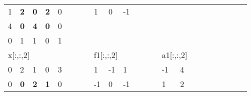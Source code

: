 \begin{table}[h]
\begin{tabular}{lllllllllllllllllllllll}
\multicolumn{1}{|l|}{1} & \multicolumn{1}{l|}{\textbf{2}} & \multicolumn{1}{l|}{\textbf{0}} & \multicolumn{1}{l|}{\textbf{2}} & \multicolumn{1}{l|}{0} &  &  & \multicolumn{1}{l|}{} & \multicolumn{1}{l|}{1}  & \multicolumn{1}{l|}{0}  & \multicolumn{1}{l|}{-1} &  &  &                       &                         &                        &  &  &                       &                        &                         &  &  \\ \cline{1-5} \cline{9-11}
\multicolumn{1}{|l|}{4} & \multicolumn{1}{l|}{\textbf{0}} & \multicolumn{1}{l|}{\textbf{4}} & \multicolumn{1}{l|}{\textbf{0}} & \multicolumn{1}{l|}{0} &  &  &                       &                         & \textbf{}               & \textbf{}               &  &  &                       &                         &                        &  &  &                       &                        &                         &  &  \\ \cline{1-5}
\multicolumn{1}{|l|}{0} & \multicolumn{1}{l|}{1}          & \multicolumn{1}{l|}{1}          & \multicolumn{1}{l|}{0}          & \multicolumn{1}{l|}{1} &  &  &                       &                         &                         &                         &  &  &                       &                         &                        &  &  &                       &                        &                         &  &  \\ \cline{1-5}
\multicolumn{5}{l}{x{[}:,:,2{]}}                                                                                                                       &  &  &                       & \multicolumn{3}{l}{f1{[}:,:,2{]}}                                           &  &  &                       & \multicolumn{2}{l}{a1{[}:,:,2{]}}                &  &  &                       &                        &                         &  &  \\ \cline{1-5} \cline{9-11} \cline{15-16}
\multicolumn{1}{|l|}{0} & \multicolumn{1}{l|}{2}          & \multicolumn{1}{l|}{1}          & \multicolumn{1}{l|}{0}          & \multicolumn{1}{l|}{3} &  &  & \multicolumn{1}{l|}{} & \multicolumn{1}{l|}{1}  & \multicolumn{1}{l|}{-1} & \multicolumn{1}{l|}{1}  &  &  & \multicolumn{1}{l|}{} & \multicolumn{1}{l|}{-1} & \multicolumn{1}{l|}{4} &  &  &                       &                        &                         &  &  \\ \cline{1-5} \cline{9-11} \cline{15-16}
\multicolumn{1}{|l|}{0} & \multicolumn{1}{l|}{\textbf{0}} & \multicolumn{1}{l|}{\textbf{2}} & \multicolumn{1}{l|}{\textbf{1}} & \multicolumn{1}{l|}{0} &  &  & \multicolumn{1}{l|}{} & \multicolumn{1}{l|}{-1} & \multicolumn{1}{l|}{0}  & \multicolumn{1}{l|}{-1} &  &  & \multicolumn{1}{l|}{} & \multicolumn{1}{l|}{1}  & \multicolumn{1}{l|}{2} &  &  &                       &                        &                         &  &  \\ \cline{1-5} \cline{9-11} \cline{15-16}

\end{tabular}
\end{table}
